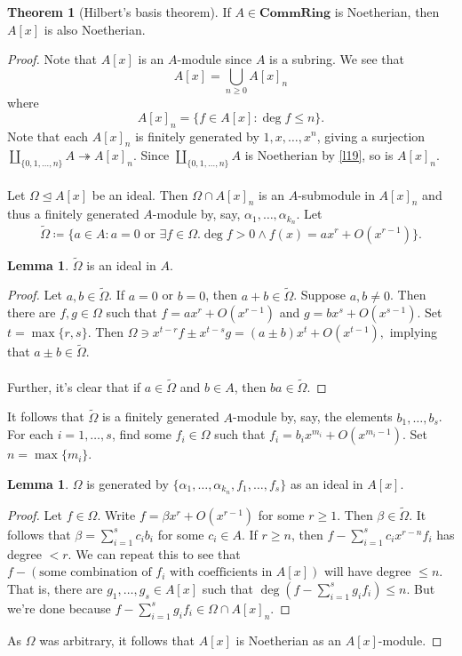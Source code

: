 \documentclass[10pt,letterpaper,cm]{nupset}
\theoremstyle{definition}
\theoremstyle{theorem}
\newtheorem{theorem}[definition]{Theorem}
\newtheorem{lemma}[definition]{Lemma}
\theoremstyle{remark}
\newcommand{\1}{\mathbf{1}}
\newcommand{\0}{\vec 0}
\begin{document}
\begin{theorem}[Hilbert's basis theorem] 
If $A\in \mathbf{CommRing}$ is Noetherian, then $A[x]$ is also Noetherian. 
\end{theorem}
\begin{proof}
Note that $A[x]$ is an $A$-module since $A$ is a subring. We see that $$A[x] = \bigcup_{n\geq 0} A[x]_n$$ where $$A[x]_n =  \{f \in A[x] : \deg f \leq n\}  .$$
Note that each $A[x]_n$ is finitely generated by $1, x, \ldots, x^n$, giving a surjection $\coprod_{\{0, 1, \ldots, n\}}A \twoheadrightarrow A[x]_n$. Since $\coprod_{\{0, 1, \ldots, n\}}A$ is Noetherian by \cref{l19}, so is $A[x]_n$.
\\ \\ Let $\Omega \unlhd A[x]$ be an ideal. Then $\Omega \cap A[x]_n$ is an $A$-submodule in $A[x]_n$ and thus a finitely generated $A$-module by, say, $\alpha_1, \ldots, \alpha_{k_n}$. Let $$\widetilde{\Omega} \coloneqq  \{a\in A : a = 0 \text{ or } \exists f\in \Omega. \deg f >0 \land f(x) = ax^r+ O(x^{r-1})\}.$$
\begin{lemma}
$\widetilde{\Omega}$ is an ideal in $A$.
\end{lemma}
\begin{proof}
Let $a,b \in \widetilde{\Omega}$. If $a=0$ or $b=0$, then $a+b\in \widetilde{\Omega}$. Suppose $a,b\ne 0$. Then there are $f, g \in 
\Omega$ such that $f= ax^r + O(x^{r-1})$ and $g= bx^s + O(x^{s-1})$. Set $t=\max\{r, s\}$. Then ${\Omega} \ni x^{t-r}f \pm x^{t-s}g = (a\pm b)x^t +O(x^{t-1}),$ implying that $a\pm b \in \widetilde{\Omega}$.
\\ \\
Further, it's clear that if $a\in \widetilde{\Omega}$ and $b\in A$, then $ba\in \widetilde{\Omega}$. 
\end{proof}
It follows that $\widetilde{\Omega}$ is a finitely generated $A$-module by, say, the elements $b_1, \ldots, b_s$. For each $i=1, \ldots, s$, find some $f_i \in \Omega$ such that $f_i = b_ix^{m_i} + O(x^{m_i-1})$. Set $n= \max\{m_i\}$.
\begin{lemma}
$\Omega$ is generated by $\{\alpha_1, \ldots, \alpha_{k_n}, f_1, \ldots, f_s\}$ as an ideal in $A[x]$.
\end{lemma}
\begin{proof}
Let $f\in \Omega$. Write $f = \beta x^r + O(x^{r-1})$ for some $r \geq 1$. Then $\beta \in \widetilde{\Omega}$. It follows that $\beta = \sum_{i=1}^s c_ib_i$ for some $c_i \in A$. If $r \geq n$, then $f -\sum_{i=1}^s c_ix^{r-n}f_i$ has degree $< r$. We can repeat this to see that $f - (\text{some combination of } f_i \text{ with coefficients in } A[x])$ will have degree $\leq n$. That is, there are $g_1, \ldots, g_s \in A[x]$ such that $\deg(f - \sum_{i=1}^sg_if_i) \leq n$. But we're done because $f - \sum_{i=1}^sg_if_i \in \Omega \cap A[x]_n$.
\end{proof}$ $As $\Omega$ was arbitrary, it follows that $A[x]$ is Noetherian as an $A[x]$-module. 
\end{proof}
\end{document}
